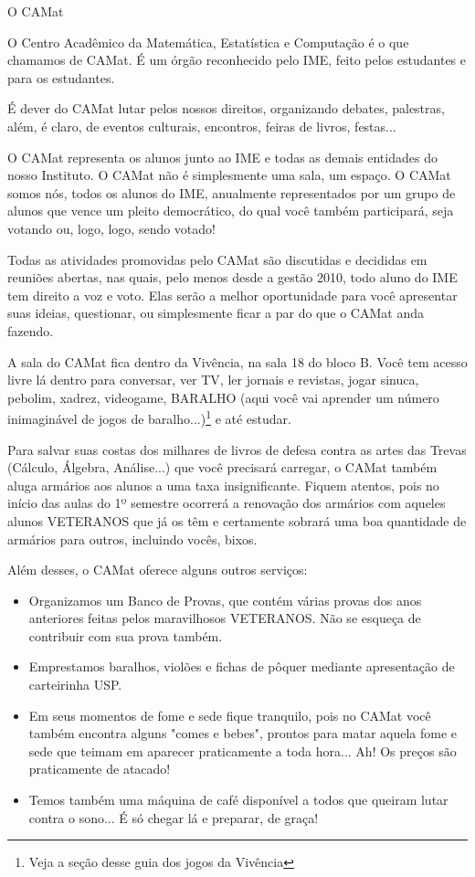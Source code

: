 \begin{secao}{O CAMat}

O Centro Acadêmico da Matemática, Estatística e Computação é o que chamamos de
CAMat. É um órgão reconhecido pelo IME, feito pelos estudantes e para os
estudantes.

É dever do CAMat lutar pelos nossos direitos, organizando debates, palestras,
além, é claro, de eventos culturais, encontros, feiras de livros, festas...

O CAMat representa os alunos junto ao IME e todas as demais entidades do nosso
Instituto. O CAMat não é simplesmente uma sala, um espaço. O CAMat somos nós,
todos os alunos do IME, anualmente representados por um grupo de alunos que
vence um pleito democrático, do qual você também participará, seja votando ou,
logo, logo, sendo votado!

Todas as atividades promovidas pelo CAMat são discutidas e decididas em
reuniões abertas, nas quais, pelo menos desde a gestão 2010, todo aluno do IME tem
direito a voz e voto. Elas serão a melhor oportunidade para você apresentar suas
ideias, questionar, ou simplesmente ficar a par do que o CAMat
anda fazendo.

A sala do CAMat  fica dentro da Vivência, na sala 18 do bloco B. Você tem acesso
livre lá dentro para conversar, ver TV, ler jornais e revistas, jogar sinuca,
pebolim, xadrez, videogame, BARALHO (aqui você vai aprender um número inimaginável de
jogos de baralho...)\footnote{Veja a seção desse guia dos jogos da
Vivência} e até estudar.

Para salvar suas costas dos milhares de livros de defesa contra as artes das
Trevas (Cálculo, Álgebra, Análise...) que você precisará carregar, o CAMat
também aluga armários aos alunos a uma taxa insignificante. Fiquem atentos, pois no
início das aulas do 1º semestre ocorrerá a renovação dos armários com
aqueles alunos VETERANOS que já os têm e certamente sobrará uma boa quantidade
de armários para outros, incluindo vocês, bixos.

Além desses, o CAMat oferece alguns outros serviços:

\begin{itemize}
\item Organizamos um Banco de Provas, que contém várias provas dos anos anteriores feitas
pelos maravilhosos VETERANOS. Não se esqueça de contribuir com sua prova também.
\item Emprestamos baralhos, violões e fichas de pôquer mediante apresentação de
carteirinha USP.
\item Em seus momentos de fome e sede fique tranquilo, pois no CAMat você
também encontra alguns "comes e bebes", prontos para matar aquela fome e sede
que teimam em aparecer praticamente a toda hora... Ah! Os preços são praticamente
de atacado!
\item Temos também uma máquina de café disponível a todos que queiram lutar
contra o sono... É só chegar lá e preparar, de graça!
\end{itemize}


\end{secao}
